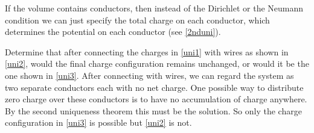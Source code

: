\documentclass[english,a4paper,12pt]{report}
\begin{document}
If the volume contains conductors, then instead of the Dirichlet or the Neumann condition we can just specify the total charge on each conductor, which determines the potential on each conductor (see \cref{2nduni}). 




{Determine that after connecting the charges in \cref{uni1} with wires as shown in \cref{uni2}, would the final charge configuration remains unchanged, or would it be the one shown in \cref{uni3}.}
{After connecting with wires, we can regard the system as two separate conductors each with no net charge. One possible way to distribute zero charge over these conductors is to have no accumulation of charge anywhere. By the second uniqueness theorem this must be the solution. So only the charge configuration in \cref{uni3} is possible but \cref{uni2} is not. 
} 
\end{document}
